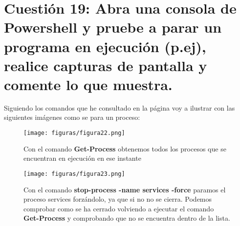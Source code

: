 \section{Cuestión 19: Abra una consola de Powershell y pruebe a parar un programa en ejecución (p.ej), realice capturas de pantalla y comente lo que muestra.}
Siguiendo los comandos que he consultado en la página \cite{powershell} voy a ilustrar con las siguientes imágenes como se para un proceso:
\begin{figure}[H] %
	\centering
	\texttt{[image: figuras/figura22.png]}  %
	\label{figura22}
	
	\caption{Con el comando \textbf{Get-Process} obtenemos todos los procesos que se encuentran en ejecución en ese instante } 
\end{figure}
\begin{figure}[H] %
	\centering
	\texttt{[image: figuras/figura23.png]}  %
	\label{figura23}
	
	\caption{Con el comando \textbf{stop-process -name services -force} paramos el proceso services forzándolo, ya que si no no se cierra. Podemos comprobar como se ha cerrado volviendo a ejecutar el comando \textbf{Get-Process} y comprobando que no se encuentra dentro de la lista.  } 
\end{figure}
\newpage
